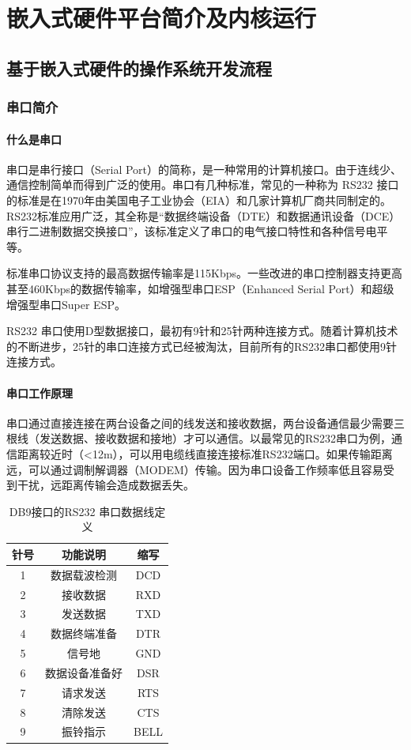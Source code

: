 \chapter{嵌入式硬件平台简介及内核运行}
\section{基于嵌入式硬件的操作系统开发流程}

\subsection{串口简介}

\subsubsection{什么是串口}

串口是串行接口（Serial Port）的简称，是一种常用的计算机接口。由于连线少、通信控制简单而得到广泛的使用。串口有几种标准，常见的一种称为 RS232 接口的标准是在1970年由美国电子工业协会（EIA）和几家计算机厂商共同制定的。RS232标准应用广泛，其全称是“数据终端设备（DTE）和数据通讯设备（DCE）串行二进制数据交换接口”，该标准定义了串口的电气接口特性和各种信号电平等。


标准串口协议支持的最高数据传输率是115Kbps。一些改进的串口控制器支持更高甚至460Kbps的数据传输率，如增强型串口ESP（Enhanced Serial Port）和超级增强型串口Super ESP。


RS232 串口使用D型数据接口，最初有9针和25针两种连接方式。随着计算机技术的不断进步，25针的串口连接方式已经被淘汰，目前所有的RS232串口都使用9针连接方式。

\subsubsection{串口工作原理}

串口通过直接连接在两台设备之间的线发送和接收数据，两台设备通信最少需要三根线（发送数据、接收数据和接地）才可以通信。以最常见的RS232串口为例，通信距离较近时（<12m），可以用电缆线直接连接标准RS232端口。如果传输距离远，可以通过调制解调器（MODEM）传输。因为串口设备工作频率低且容易受到干扰，远距离传输会造成数据丢失。

\begin{table}[!ht]
	\centering
	\begin{tabular}{|c|c|c|}
		\hline
		\textbf{针号} & \textbf{功能说明} & \textbf{缩写} \\
		\hline
		1 & 数据载波检测 & DCD  \\
		2 & 接收数据 & RXD  \\
		3 & 发送数据 & TXD \\
		4 & 数据终端准备 & DTR \\
		5 & 信号地 & GND \\
		6 & 数据设备准备好 & DSR \\
		7 & 请求发送 & RTS \\
		8 & 清除发送 & CTS \\
		9 & 振铃指示 & BELL \\
		\hline
	\end{tabular}
	\caption{DB9接口的RS232 串口数据线定义}
	\label{DB9接口的RS232 串口数据线定义}
\end{table}

